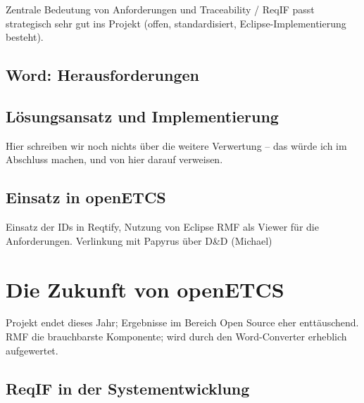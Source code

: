 \documentclass[twoside]{article}
\begin{document}
\begin{multicols}{2}
Zentrale Bedeutung von Anforderungen und Traceability / ReqIF passt strategisch sehr gut ins Projekt (offen, standardisiert, Eclipse-Implementierung besteht).

\subsection{Word: Herausforderungen}

\subsection{Lösungsansatz und Implementierung}

Hier schreiben wir noch nichts über die weitere Verwertung – das würde ich im Abschluss machen, und von hier darauf verweisen.

\subsection{Einsatz in openETCS}

Einsatz der IDs in Reqtify, Nutzung von Eclipse RMF als Viewer für die Anforderungen. Verlinkung mit Papyrus über D\&D (Michael)

\section{Die Zukunft von openETCS}

Projekt endet dieses Jahr; Ergebnisse im Bereich Open Source eher enttäuschend. RMF die brauchbarste Komponente; wird durch den Word-Converter erheblich aufgewertet.

\subsection{ReqIF in der Systementwicklung}


\end{multicols}
\end{document}
